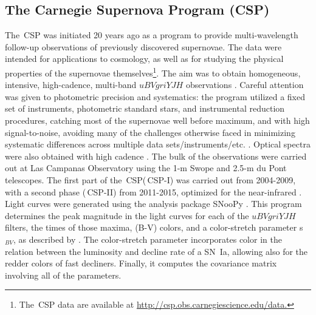 \documentclass[12pt,modern]{aastex631}
\newcommand{\csp}{\,CSP\xspace}
\newcommand{\cspi}{\,CSP-I\xspace}
\newcommand{\cspii}{\,CSP-II\xspace}
\newcommand{\sn}{SN~Ia\xspace}
\begin{document}
\subsection{The Carnegie Supernova Program (CSP)}
\label{sec:CSP}

The \csp \citep{contreras_2010, folatelli_2010, krisciunas_2017} was initiated 20 years ago as a program to provide multi-wavelength follow-up observations of previously discovered supernovae.  The data were intended for applications to cosmology, as well as for studying the physical properties of the supernovae themselves\footnote{The \csp data are available at \url{http://csp.obs.carnegiescience.edu/data.}}. The aim was to obtain homogeneous, intensive, high-cadence, multi-band $uBVgriYJH$ observations  \citep{contreras_2010}.  Careful attention was given to photometric precision and systematics: the program utilized a fixed set of instruments, photometric standard stars, and instrumental reduction procedures, catching most of the supernovae well before maximum, and with high signal-to-noise, avoiding many of the challenges otherwise faced in minimizing systematic differences across multiple data sets/instruments/etc. \citep{krisciunas_2017}. Optical spectra were also obtained with high cadence \citep{folatelli_2013,morrell_2024}. 
The bulk of the observations were carried out at Las Campanas Observatory using the 1-m Swope and 2.5-m du Pont telescopes. The first part of the \csp (\cspi) was carried out from 2004-2009, with a second phase (\cspii) from 2011-2015, optimized for the near-infrared \citep{phillips_2019, hsiao_2019}. Light curves were generated using the analysis package SNooPy \citep{burns_2018}. This program determines the peak magnitude in the light curves for each of the $uBVgriYJH$ filters, the times of those maxima, (B-V) colors, and a color-stretch parameter s$_{BV}$, as described by \citet{burns_2014}. The color-stretch parameter  incorporates color in the relation between the luminosity and decline rate of a \sn, allowing also for the redder colors of fast decliners. 
Finally, it computes the covariance matrix involving all of the parameters.
\end{document}
